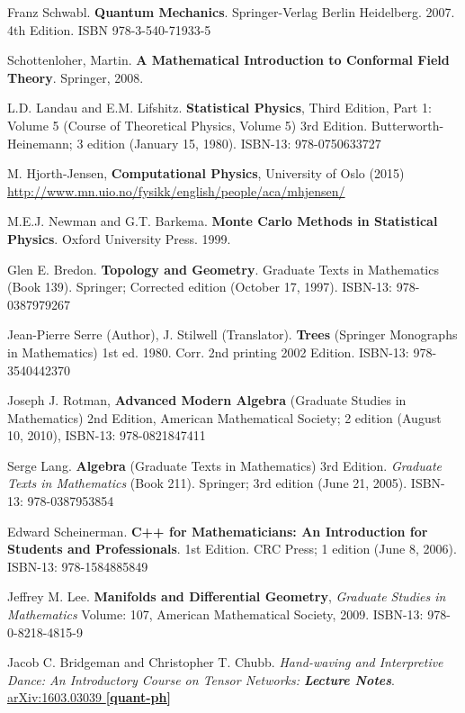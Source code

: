 \documentclass[10pt]{amsart}
\begin{document}
\begin{thebibliography}{9}
Franz Schwabl. \textbf{Quantum Mechanics}. Springer-Verlag Berlin Heidelberg. 2007. 4th Edition. ISBN 978-3-540-71933-5


Schottenloher, Martin.  \textbf{A Mathematical Introduction to Conformal Field Theory}.  Springer, 2008.  

L.D. Landau and E.M. Lifshitz.  \textbf{Statistical Physics}, Third Edition, Part 1: Volume 5 (Course of Theoretical Physics, Volume 5) 3rd Edition.  Butterworth-Heinemann; 3 edition (January 15, 1980).  ISBN-13: 978-0750633727

M. Hjorth-Jensen, \textbf{Computational Physics}, University of Oslo (2015) \url{http://www.mn.uio.no/fysikk/english/people/aca/mhjensen/}



M.E.J. Newman and G.T. Barkema.  \textbf{Monte Carlo Methods in Statistical Physics}.  Oxford University Press.  1999.  


Glen E. Bredon.  \textbf{Topology and Geometry}. Graduate Texts in Mathematics (Book 139).  Springer; Corrected edition (October 17, 1997).  ISBN-13: 978-0387979267


Jean-Pierre Serre (Author), J. Stilwell (Translator).  \textbf{Trees} (Springer Monographs in Mathematics) 1st ed. 1980. Corr. 2nd printing 2002 Edition.  ISBN-13: 978-3540442370

Joseph J. Rotman, \textbf{Advanced Modern Algebra} (Graduate Studies in Mathematics) 2nd Edition, American Mathematical Society; 2 edition (August 10, 2010), ISBN-13: 978-0821847411

Serge Lang. \textbf{Algebra} (Graduate Texts in Mathematics) 3rd Edition. \emph{Graduate Texts in Mathematics} (Book 211). Springer; 3rd edition (June 21, 2005). ISBN-13: 978-0387953854

Edward Scheinerman.  \textbf{C++ for Mathematicians: An Introduction for Students and Professionals}. 1st Edition.  CRC Press; 1 edition (June 8, 2006).  ISBN-13: 978-1584885849 


Jeffrey M. Lee. \textbf{Manifolds and Differential Geometry}, \emph{Graduate Studies in Mathematics} Volume: 107, American Mathematical Society, 2009. ISBN-13: 978-0-8218-4815-9

Jacob C. Bridgeman and Christopher T. Chubb.  \emph{Hand-waving and Interpretive Dance: An Introductory Course on Tensor Networks: \textbf{Lecture Notes}}.  \href{https://arxiv.org/abs/1603.03039}{arXiv:1603.03039 \textbf{[quant-ph]}}


\end{thebibliography}
\end{document}
